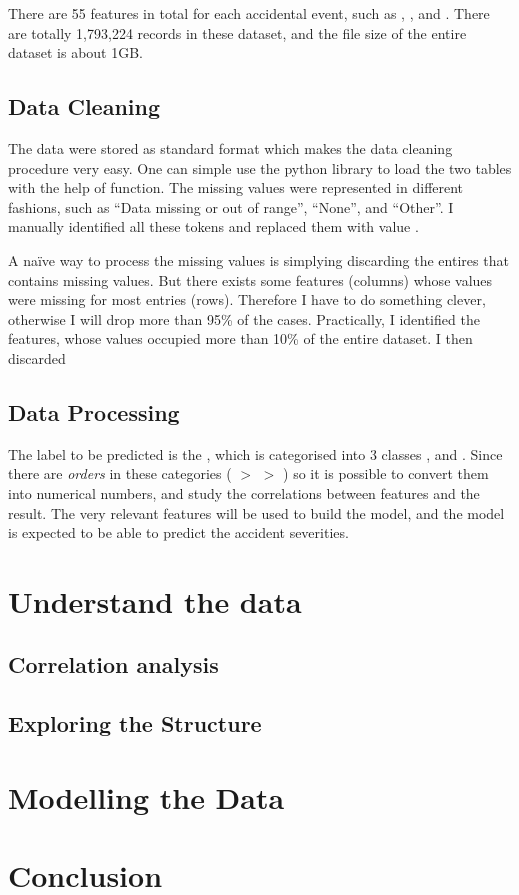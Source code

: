 \documentclass[12pt,a4paper]{article}
\begin{document}
There are 55 features in total for each accidental event, such as , , and . There are totally 1,793,224  records in these dataset, and the file size of the entire dataset is about 1GB. 

\subsection{Data Cleaning}

The data were stored as standard  format which makes the data cleaning procedure very easy. One can simple use the python library  to load the two tables with the help of  function. The missing values were represented in different fashions, such as ``Data missing or out of range'', ``None'', and ``Other''. I manually identified all these tokens and replaced them with value .

A na\"{i}ve way to process the missing values is simplying discarding the entires that contains missing values. But there exists some features (columns) whose values were missing for most entries (rows). Therefore I have to do something clever, otherwise I will drop more than 95\% of the cases. Practically, I identified the features, whose  values occupied more than 10\% of the entire dataset. I then discarded 

\subsection{Data Processing}

The label to be predicted is the , which is categorised into 3 classes ,  and . Since there are \emph{orders} in these categories ( $>$  $>$ ) so it is possible to convert them into numerical numbers, and study the correlations between features and the result. The very relevant features will be used to build the model, and the model is expected to be able to predict the accident severities.

\section{Understand the data}

\subsection{Correlation analysis}

\subsection{Exploring the Structure}

\section{Modelling the Data}

\section{Conclusion}
\end{document}
